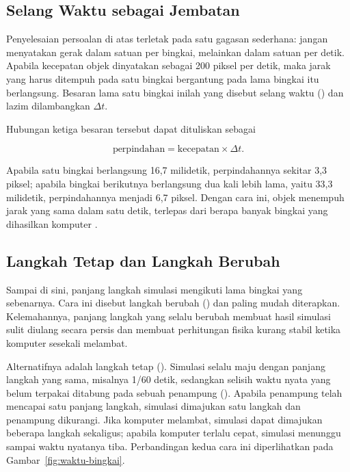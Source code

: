 \subsection{Selang Waktu sebagai Jembatan}

Penyelesaian persoalan di atas terletak pada satu gagasan sederhana: jangan
menyatakan gerak dalam satuan per bingkai, melainkan dalam satuan per detik.
Apabila kecepatan objek dinyatakan sebagai 200 piksel per detik, maka jarak
yang harus ditempuh pada satu bingkai bergantung pada lama bingkai itu
berlangsung. Besaran lama satu bingkai inilah yang disebut selang waktu
() dan lazim dilambangkan $\Delta t$.

Hubungan ketiga besaran tersebut dapat dituliskan sebagai

\begin{equation}
\label{eq:gerak-dt}
\text{perpindahan} = \text{kecepatan} \times \Delta t .
\end{equation}

Apabila satu bingkai berlangsung 16,7 milidetik, perpindahannya sekitar 3,3
piksel; apabila bingkai berikutnya berlangsung dua kali lebih lama, yaitu 33,3
milidetik, perpindahannya menjadi 6,7 piksel. Dengan cara ini, objek menempuh
jarak yang sama dalam satu detik, terlepas dari berapa banyak bingkai yang
dihasilkan komputer \cite{fiedler-timestep}.

\subsection{Langkah Tetap dan Langkah Berubah}

Sampai di sini, panjang langkah simulasi mengikuti lama bingkai yang
sebenarnya. Cara ini disebut langkah berubah () dan
paling mudah diterapkan. Kelemahannya, panjang langkah yang selalu berubah
membuat hasil simulasi sulit diulang secara persis dan membuat perhitungan
fisika kurang stabil ketika komputer sesekali melambat.

Alternatifnya adalah langkah tetap (). Simulasi selalu
maju dengan panjang langkah yang sama, misalnya 1/60 detik, sedangkan selisih
waktu nyata yang belum terpakai ditabung pada sebuah penampung
(). Apabila penampung telah mencapai satu panjang
langkah, simulasi dimajukan satu langkah dan penampung dikurangi. Jika
komputer melambat, simulasi dapat dimajukan beberapa langkah sekaligus;
apabila komputer terlalu cepat, simulasi menunggu sampai waktu nyatanya tiba.
Perbandingan kedua cara ini diperlihatkan pada Gambar~\ref{fig:waktu-bingkai}.

